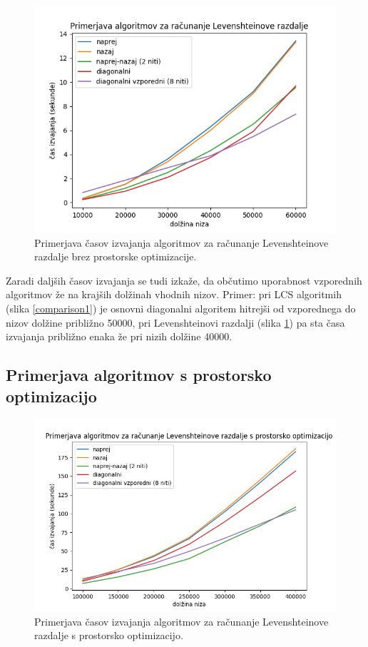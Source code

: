 \documentclass[a4paper,12pt,openright]{book}
\begin{document}
\begin{figure}[htb]
\centering
\includegraphics[width=1.0\textwidth]{plots/LevenshteinTotal.png}
\caption{Primerjava časov izvajanja algoritmov za računanje Levenshteinove razdalje brez prostorske optimizacije.}
\label{comparison4}
\end{figure}

Zaradi daljših časov izvajanja se tudi izkaže, da občutimo uporabnost vzporednih algoritmov že na krajših dolžinah vhodnih nizov. Primer: pri LCS algoritmih (slika \ref{comparison1}) je osnovni diagonalni algoritem hitrejši od vzporednega do nizov dolžine približno 50000, pri Levenshteinovi razdalji (slika \ref{comparison4}) pa sta časa izvajanja približno enaka že pri nizih dolžine 40000. 

\subsection{Primerjava algoritmov s prostorsko optimizacijo}

\begin{figure}[htb]
\centering
\includegraphics[width=1.0\textwidth]{plots/LevenshteinSpace.png}
\caption{Primerjava časov izvajanja algoritmov za računanje Levenshteinove razdalje s prostorsko optimizacijo.}
\label{comparison6}
\end{figure}
\end{document}
